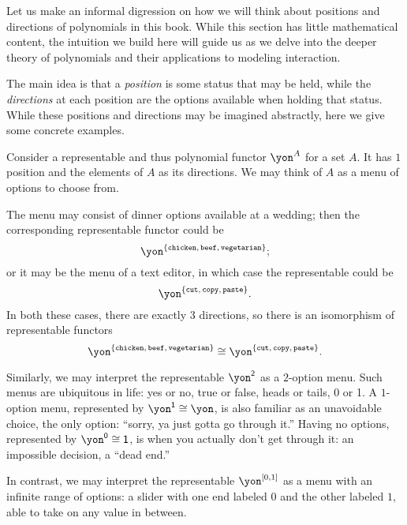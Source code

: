 \documentclass[Book-Poly]{subfiles}
\begin{document}
Let us make an informal digression on how we will think about positions and directions of polynomials in this book.
While this section has little mathematical content, the intuition we build here will guide us as we delve into the deeper theory of polynomials and their applications to modeling interaction.

The main idea is that a \emph{position} is some status that may be held, while the \emph{directions} at each position are the options available when holding that status.
While these positions and directions may be imagined abstractly, here we give some concrete examples.

\begin{example} \label{ex.reps-as-menus}
    Consider a representable and thus polynomial functor $\yon^A$ for a set $A$.
    It has $1$ position and the elements of $A$ as its directions.
    We may think of $A$ as a menu of options to choose from.

    The menu may consist of dinner options available at a wedding; then the corresponding representable functor could be
    \[
        \yon^{\{\const{chicken},\,\const{beef},\,\const{vegetarian}\}};
    \]
    or it may be the menu of a text editor, in which case the representable could be
    \[
        \yon^{\{\const{cut},\,\const{copy},\, \const{paste}\}}.
    \]
    In both these cases, there are exactly $3$ directions, so there is an isomorphism of representable functors
    \[
        \yon^{\{\const{chicken},\,\const{beef},\,\const{vegetarian}\}} \iso \yon^{\{\const{cut},\,\const{copy},\, \const{paste}\}}.
    \]

    Similarly, we may interpret the representable $\yon^\2$ as a $2$-option menu.
    Such menus are ubiquitous in life: yes or no, true or false, heads or tails, 0 or 1.
    A $1$-option menu, represented by $\yon^\1\iso\yon$, is also familiar as an unavoidable choice, the only option: ``sorry, ya just gotta go through it.''
    Having no options, represented by $\yon^\0\iso\1$, is when you actually don't get through it: an impossible decision, a ``dead end.''

    In contrast, we may interpret the representable $\yon^{[0,1]}$ as a menu with an infinite range of options: a slider with one end labeled $0$ and the other labeled $1$, able to take on any value in between.
\end{example}
\end{document}
